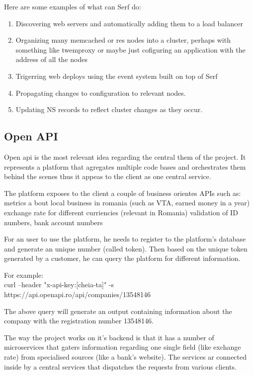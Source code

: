 \documentclass[12pt, oneside]{article}
\begin{document}
	Here are some examples of what can Serf do:
	\begin{enumerate}
	\item Discovering web servers and automatically adding them to a load balancer \\
	\item Organizing many memcached or res nodes into a cluster, perhaps with something like twemproxy or maybe just cofiguring an application with the address of all the nodes \\ 
	\item Trigerring web deploys using the event system built on top of Serf \\
	\item Propagating changes to configuration to relevant nodes. \\
	\item Updating NS records to reflect cluster changes as they occur.
	\end{enumerate}
	
	\subsection{Open API}
	Open api is the most relevant idea regarding the central them of the project. It represents a platform that agregates multiple code bases and orchestrates them behind the scenes thus it appeas to the client as one central service.

The platform exposes to the client a couple of business orientes APIs such as:
metrics a bout local business in romania (such as VTA, earned money in a year)
exchange rate for different curriencies (relevant in Romania)
validation of ID numbers, bank account numbers

For an user to use the platform, he needs to register to the platform’s database and generate an unique number (called token). Then based on the unique token generated by a customer, he can query the platform for different information.

For example: \\
curl --header "x-api-key:[cheia-ta]" -s https://api.openapi.ro/api/companies/13548146

The above query will generate an output containing information about the company with the registration number 13548146.

The way the project works on it’s backend is that it has a number of microservices that gaters information regarding one single field (like exchange rate) from specialised sources (like a bank’s website). The services ar connected inside by a central services that dispatches the requests from various clients.
\end{document}
